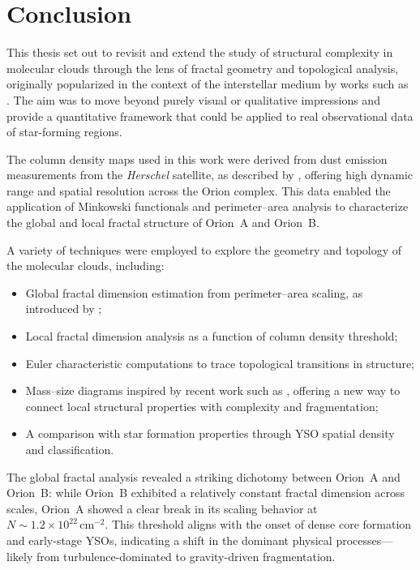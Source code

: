 \chapter{Conclusion}

This thesis set out to revisit and extend the study of structural complexity in molecular clouds through the lens of fractal geometry and topological analysis, originally popularized in the context of the interstellar medium by works such as \cite{elmegreen1996fractal}. The aim was to move beyond purely visual or qualitative impressions and provide a quantitative framework that could be applied to real observational data of star-forming regions.

The column density maps used in this work were derived from dust emission measurements from the \textit{Herschel} satellite, as described by \cite{lombardi2014herschel}, offering high dynamic range and spatial resolution across the Orion complex. This data enabled the application of Minkowski functionals and perimeter–area analysis to characterize the global and local fractal structure of Orion~A and Orion~B.

A variety of techniques were employed to explore the geometry and topology of the molecular clouds, including:
\begin{itemize}
    \item Global fractal dimension estimation from perimeter–area scaling, as introduced by \cite{cannon1984fractal};
    \item Local fractal dimension analysis as a function of column density threshold;
    \item Euler characteristic computations to trace topological transitions in structure;
    \item Mass–size diagrams inspired by recent work such as \cite{Hacar_2025}, offering a new way to connect local structural properties with complexity and fragmentation;
    \item A comparison with star formation properties through YSO spatial density and classification.
\end{itemize}

The global fractal analysis revealed a striking dichotomy between Orion~A and Orion~B: while Orion~B exhibited a relatively constant fractal dimension across scales, Orion~A showed a clear break in its scaling behavior at \( N \sim 1.2 \times 10^{22} \,\mathrm{cm}^{-2} \). This threshold aligns with the onset of dense core formation and early-stage YSOs, indicating a shift in the dominant physical processes—likely from turbulence-dominated to gravity-driven fragmentation.

